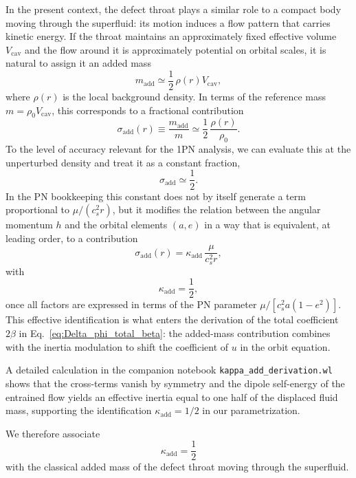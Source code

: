 \documentclass[11pt]{article}
\newcommand{\cS}{c_s}
\begin{document}
In the present context, the defect throat plays a similar role to a compact body moving through the superfluid: its motion induces a flow pattern that carries kinetic energy. If the throat maintains an approximately fixed effective volume $V_{\mathrm{cav}}$ and the flow around it is approximately potential on orbital scales, it is natural to assign it an added mass
\begin{equation}
  m_{\mathrm{add}}
  \simeq \frac{1}{2}\,\rho(r) V_{\mathrm{cav}},
\end{equation}
where $\rho(r)$ is the local background density. In terms of the reference mass $m = \rho_0 V_{\mathrm{cav}}$, this corresponds to a fractional contribution
\begin{equation}
  \sigma_{\mathrm{add}}(r)
  \equiv \frac{m_{\mathrm{add}}}{m}
  \simeq \frac{1}{2}\,\frac{\rho(r)}{\rho_0}.
\end{equation}
To the level of accuracy relevant for the 1PN analysis, we can evaluate this at the unperturbed density and treat it as a constant fraction,
\begin{equation}
  \sigma_{\mathrm{add}} \simeq \frac{1}{2}.
\end{equation}
In the PN bookkeeping this constant does not by itself generate a term proportional to $\mu/(\cS^2 r)$, but it modifies the relation between the angular momentum $h$ and the orbital elements $(a,e)$ in a way that is equivalent, at leading order, to a contribution
\begin{equation}
  \sigma_{\mathrm{add}}(r)
  = \kappa_{\mathrm{add}}\,\frac{\mu}{\cS^2 r},
\end{equation}
with
\begin{equation}
  \kappa_{\mathrm{add}} = \frac{1}{2},
\end{equation}
once all factors are expressed in terms of the PN parameter $\mu/[\cS^2 a(1-e^2)]$. This effective identification is what enters the derivation of the total coefficient $2\beta$ in Eq.~\eqref{eq:Delta_phi_total_beta}: the added-mass contribution combines with the inertia modulation to shift the coefficient of $u$ in the orbit equation.

A detailed calculation in the companion notebook \texttt{kappa\_add\_derivation.wl} shows that the cross-terms vanish by symmetry and the dipole self-energy of the entrained flow yields an effective inertia equal to one half of the displaced fluid mass, supporting the identification $\kappa_{\mathrm{add}} = 1/2$ in our parametrization.

We therefore associate
\begin{equation}
  \kappa_{\mathrm{add}} = \frac{1}{2}
\end{equation}
with the classical added mass of the defect throat moving through the superfluid.
\end{document}
